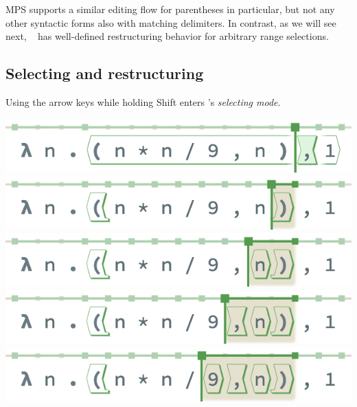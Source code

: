 MPS supports a similar editing flow for parentheses in particular,
but not any other syntactic forms also with matching delimiters.
In contrast, as we will see next, \tylr~ has well-defined
restructuring behavior for arbitrary range selections.

\subsection{Selecting and restructuring} \label{sec:selecting-restructuring}

Using the arrow keys while holding
Shift enters \tylr's \emph{selecting mode}.

\noindent
\begin{minipage}[t]{0.495\columnwidth}
  \includegraphics[width=\textwidth]{img/selection-0.png}
  \includegraphics[width=\textwidth]{img/selection-1.png}
  \includegraphics[width=\textwidth]{img/selection-2.png}
  \includegraphics[width=\textwidth]{img/selection-3.png}
  \includegraphics[width=\textwidth]{img/selection-4.png}
\end{minipage}
\hfill
